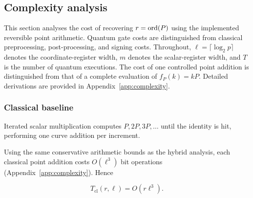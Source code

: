 \subsection{Complexity analysis}\label{sec:complexity}

\begin{revision}
This section analyses the cost of recovering $r=\operatorname{ord}(P)$ using the implemented reversible point arithmetic. Quantum gate costs are distinguished from classical preprocessing, post-processing, and signing costs. Throughout, $\ell=\lceil\log_2 p\rceil$ denotes the coordinate-register width, $m$ denotes the scalar-register width, and $T$ is the number of quantum executions. The cost of one controlled point addition is distinguished from that of a complete evaluation of $f_P(k)=kP$. Detailed derivations are provided in Appendix~\ref{app:complexity}.
\end{revision}

\subsubsection{Classical baseline}

Iterated scalar multiplication computes $P, 2P, 3P, \ldots$ until the identity is hit, performing one curve addition per increment. \begin{revision} Using the same conservative arithmetic bounds as the hybrid analysis, each classical point addition costs $O(\ell^3)$ bit operations (Appendix~\ref{app:complexity}). Hence \end{revision}

\begin{revision}

\begin{equation}
    \label{eq:classical_cost}
    T_{\mathrm{cl}}(r,\ell)=O(r\ell^3).
\end{equation}

\end{revision}

